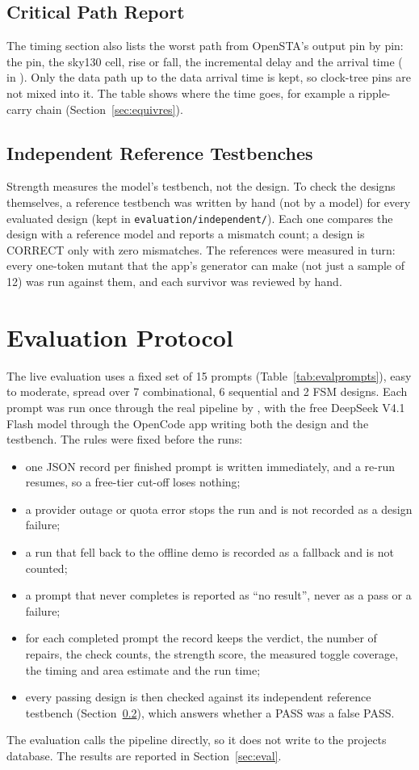 \subsection{Critical Path Report}
\label{sec:critpath}
The timing section also lists the worst path from OpenSTA's 
output pin by pin: the pin, the sky130 cell, rise or fall, the incremental delay and
the arrival time ( in ). Only the data path
up to the data arrival time is kept, so clock-tree pins are not mixed into it. The
table shows where the time goes, for example a ripple-carry chain
(Section~\ref{sec:equivres}).

\subsection{Independent Reference Testbenches}
\label{sec:reftb}
Strength measures the model's testbench, not the design. To check the designs
themselves, a reference testbench was written by hand (not by a model) for every
evaluated design (kept in \texttt{evaluation/\allowbreak independent/}). Each one compares the design with
a reference model and reports a mismatch count; a design is CORRECT only with zero
mismatches. The references were measured in turn: every one-token mutant that the
app's generator can make (not just a sample of 12) was run against them, and each
survivor was reviewed by hand.

\section{Evaluation Protocol}
\label{sec:evalprotocol}
The live evaluation uses a fixed set of 15 prompts (Table~\ref{tab:evalprompts}),
easy to moderate, spread over 7 combinational, 6 sequential and 2 FSM designs. Each
prompt was run once through the real pipeline by , with
the free DeepSeek V4.1 Flash model through the OpenCode app writing both the design
and the testbench. The rules were fixed before the runs:

\begin{itemize}
\item one JSON record per finished prompt is written immediately, and a re-run
resumes, so a free-tier cut-off loses nothing;
\item a provider outage or quota error stops the run and is not recorded as a design
failure;
\item a run that fell back to the offline demo is recorded as a fallback and is not
counted;
\item a prompt that never completes is reported as ``no result'', never as a pass or
a failure;
\item for each completed prompt the record keeps the verdict, the number of repairs,
the check counts, the strength score, the measured toggle coverage, the timing and
area estimate and the run time;
\item every passing design is then checked against its independent reference
testbench (Section~\ref{sec:reftb}), which answers whether a PASS was a false PASS.
\end{itemize}

The evaluation calls the pipeline directly, so it does not write to the projects
database. The results are reported in Section~\ref{sec:eval}.

